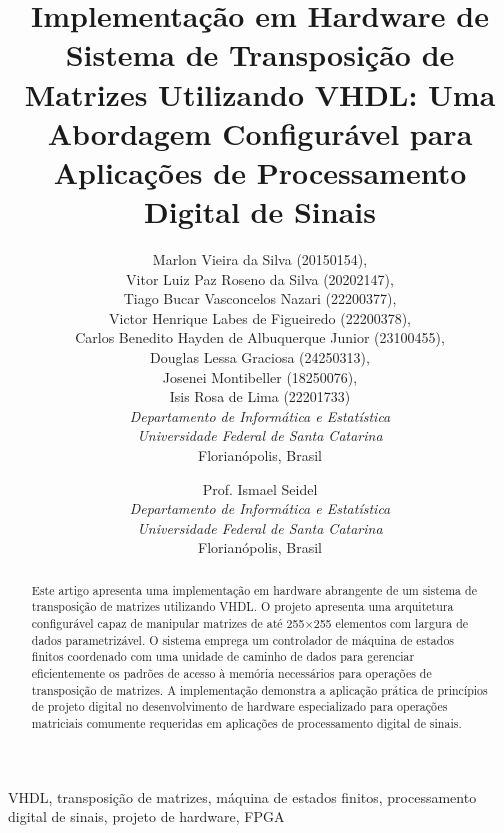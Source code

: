 \documentclass[conference]{IEEEtran}
\begin{document}
\title{Implementação em Hardware de Sistema de Transposição de Matrizes Utilizando VHDL: Uma Abordagem Configurável para Aplicações de Processamento Digital de Sinais}

\author{
Marlon Vieira da Silva (20150154),\\
Vitor Luiz Paz Roseno da Silva (20202147),\\
Tiago Bucar Vasconcelos Nazari (22200377), \\
Victor Henrique Labes de Figueiredo (22200378),\\
Carlos Benedito Hayden de Albuquerque Junior (23100455), \\
Douglas Lessa Graciosa (24250313),\\
Josenei Montibeller (18250076),\\
Isis Rosa de Lima (22201733) \\
\textit{Departamento de Informática e Estatística} \\
\textit{Universidade Federal de Santa Catarina} \\
Florianópolis, Brasil 
\and
Prof. Ismael Seidel \\
\textit{Departamento de Informática e Estatística} \\
\textit{Universidade Federal de Santa Catarina} \\
Florianópolis, Brasil
}

\maketitle

\begin{abstract}
Este artigo apresenta uma implementação em hardware abrangente de um sistema de transposição de matrizes utilizando VHDL. O projeto apresenta uma arquitetura configurável capaz de manipular matrizes de até 255×255 elementos com largura de dados parametrizável. O sistema emprega um controlador de máquina de estados finitos coordenado com uma unidade de caminho de dados para gerenciar eficientemente os padrões de acesso à memória necessários para operações de transposição de matrizes. A implementação demonstra a aplicação prática de princípios de projeto digital no desenvolvimento de hardware especializado para operações matriciais comumente requeridas em aplicações de processamento digital de sinais.
\end{abstract}

\begin{IEEEkeywords}
VHDL, transposição de matrizes, máquina de estados finitos, processamento digital de sinais, projeto de hardware, FPGA
\end{IEEEkeywords}
\end{document}
